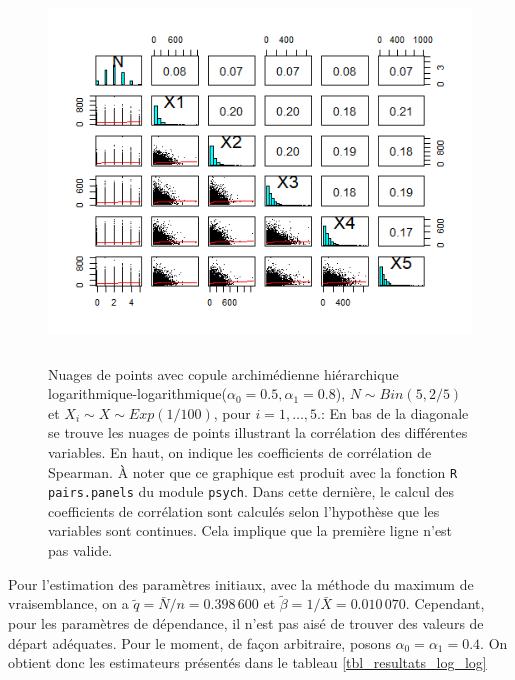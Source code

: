 \documentclass{article}
\begin{document}
		\begin{figure}[H]
			\centering
			\includegraphics[height=10cm]{Graph/scatterplot_log_log.png}
			\caption[Nuages de points du scénario \ref{scenario_log_log}]
			{Nuages de points avec copule archimédienne hiérarchique logarithmique-logarithmique($\alpha_0=0.5, \alpha_1=0.8$), $N \sim Bin(5, 2/5)$ et $X_i \sim X \sim Exp(1/100)$, pour $i=1,\dots, 5$.:
				En bas de la diagonale se trouve les nuages de points illustrant la corrélation des différentes variables. En haut, on indique les coefficients de corrélation de Spearman. À noter que ce graphique est produit avec la fonction \texttt{R} \texttt{pairs.panels} du module \texttt{psych}. Dans cette dernière, le calcul des coefficients de corrélation sont calculés selon l'hypothèse que les variables sont continues. Cela implique que la première ligne n'est pas valide.}
			\label{graph_scatterplot_log_log}
		\end{figure}
		
		Pour l'estimation des paramètres initiaux, avec la méthode du maximum de vraisemblance, on a $\tilde{q} = \bar{N}/n = 0.398\,600$ et $\tilde{\beta} = 1/\bar{X} = 0.010\,070$. Cependant, pour les paramètres de dépendance, il n'est pas aisé de trouver des valeurs de départ adéquates. Pour le moment, de façon arbitraire, posons $\alpha_{0}=\alpha_{1}=0.4$. On obtient donc les estimateurs présentés dans le tableau \ref{tbl_resultats_log_log}
		
\end{document}
